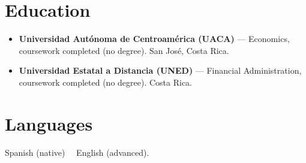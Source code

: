 \documentclass[10.5pt]{article}
\newcommand{\hsep}{\ \raisebox{0.5pt}{\scriptsize\textbullet}\ }
\begin{document}
\section{Education}
\begin{itemize}
  \item \textbf{Universidad Aut\'onoma de Centroam\'erica (UACA)} --- Economics, coursework completed (no degree). San Jos\'e, Costa Rica.
  \item \textbf{Universidad Estatal a Distancia (UNED)} --- Financial Administration, coursework completed (no degree). Costa Rica.
\end{itemize}

\section{Languages}
Spanish (native) \hsep English (advanced).
\end{document}
